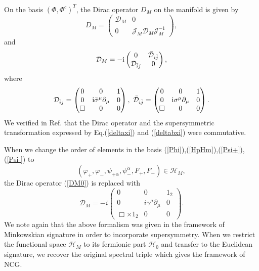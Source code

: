\documentclass{ptephy}%
\begin{document}
On the basis $(\Phi,\Phi^c)^T$, the Dirac operator $D_M$ on the manifold 
is given by 
\begin{equation}
D_M = \begin{pmatrix}
\mathcal{D}_M & 0\\
0 & \mathcal{J}_M \mathcal{D}_M \mathcal{J}_M^{-1}
\end{pmatrix},
\end{equation}
and
\begin{equation}
\mathcal{D}_M = -{\rm i}\begin{pmatrix}
0 & \bar{\mathcal{D}}_{i\bar{j}} \\
\mathcal{D}_{\bar{i}j} & 0
\end{pmatrix}, 
\label{DM0}
\end{equation}
where
\begin{equation}
\mathcal{D}_{\bar{i}j}=\begin{pmatrix}
0 & 0 & 1\\
0 & {\rm i}\bar{\sigma}^\mu\partial_\mu & 0\\
\Box & 0 & 0
\end{pmatrix},\ 
\bar{\mathcal{D}}_{i\bar{j}}= \begin{pmatrix}
0 & 0 & 1\\
0 & {\rm i}\sigma^\mu\partial_\mu & 0\\
\Box & 0 & 0
\end{pmatrix}.
\label{DM}
\end{equation}
We verified in Ref.\cite{paper0} that the Dirac operator and the supersymmetric transformation expressed by 
Eq.(\ref{deltaxi}) and (\ref{deltabxi}) were commutative. 

When we change the order of elements in the basis (\ref{Phi}),(\ref{HpHm}),(\ref{Psi+}),(\ref{Psi-}) to 
\begin{equation}
(\varphi_+,\varphi_-, \psi_{+\alpha},\psi_-^{\dot{\alpha}},F_+,F_-)\in \mathcal{H}_M \label{base1},
\end{equation}
the Dirac operator (\ref{DM0}) is replaced with 
\begin{equation}
\mathcal{D}_M = -i
\begin{pmatrix}
0 & 0 & 1_2 \\
0 & i\gamma^\mu\partial_\mu & 0\\
\Box\times 1_2 & 0 & 0
\end{pmatrix}. \label{DMflat}
\end{equation} 
We note again that the above formalism was given in the framework of Minkowskian signature 
in order to incorporate supersymmetry. 
When we restrict the functional space $\mathcal{H}_M$ to its fermionic part $\mathcal{H}_0$ and 
transfer to the Euclidean signature, 
we recover the original spectral triple which gives the framework of NCG.  
\end{document}
